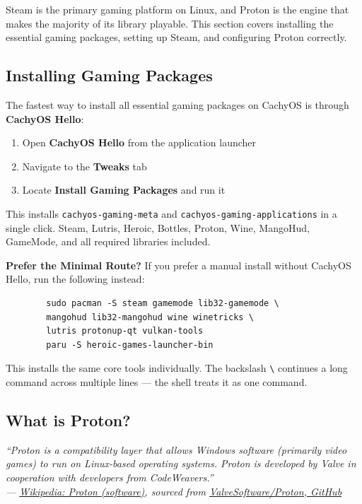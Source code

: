 \documentclass{article}
\newcommand{\code}[1]{\colorbox{codebg}{\texttt{#1}}}
\begin{document}
Steam is the primary gaming platform on Linux, and Proton is the engine that makes
the majority of its library playable. This section covers installing the essential
gaming packages, setting up Steam, and configuring Proton correctly.

\subsection{Installing Gaming Packages}

The fastest way to install all essential gaming packages on CachyOS is through
\textbf{CachyOS Hello}:

\begin{enumerate}[leftmargin=1.5em, nosep, label={\arabic*.}]
	\item Open \textbf{CachyOS Hello} from the application launcher
	\item Navigate to the \textbf{Tweaks} tab
	\item Locate \textbf{Install Gaming Packages} and run it
\end{enumerate}

This installs \code{cachyos-gaming-meta} and \code{cachyos-gaming-applications} in
a single click. Steam, Lutris, Heroic, Bottles, Proton, Wine, MangoHud, GameMode,
and all required libraries included.

\begin{callout}{\textbf{Prefer the Minimal Route?}}
	If you prefer a manual install without CachyOS Hello, run the following instead:
	\begin{verbatim}
		sudo pacman -S steam gamemode lib32-gamemode \
		mangohud lib32-mangohud wine winetricks \
		lutris protonup-qt vulkan-tools
		paru -S heroic-games-launcher-bin
	\end{verbatim}
	This installs the same core tools individually. The backslash \code{\textbackslash}
	continues a long command across multiple lines --- the shell treats it as one
	command.
\end{callout}

\subsection{What is Proton?}

\begin{mdframed}[linewidth=1.5pt, linecolor=black!50, topline=true, bottomline=true,
	leftline=false, rightline=false, backgroundcolor=black!3]
	\small\itshape
	``Proton is a compatibility layer that allows Windows software (primarily video
	games) to run on Linux-based operating systems. Proton is developed by Valve
	in cooperation with developers from CodeWeavers.''\\[4pt]
	\normalfont\small ---
	\href{https://en.wikipedia.org/wiki/Proton_(software)}{Wikipedia: Proton
		(software)}, sourced from
	\href{https://github.com/ValveSoftware/Proton}{ValveSoftware/Proton, GitHub}
\end{mdframed}
\end{document}
